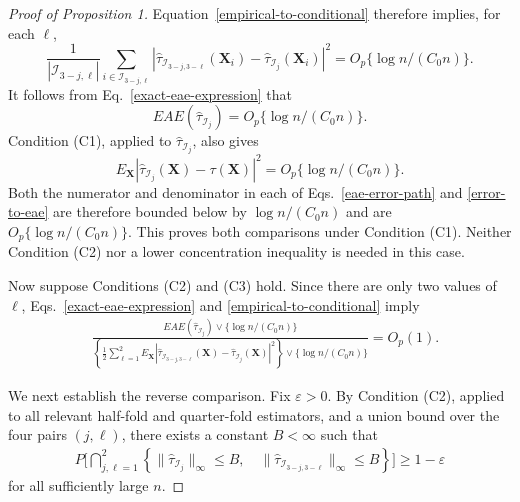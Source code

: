 \documentclass[11pt]{article}
\theoremstyle{referenceplain}
\theoremstyle{referencedefinition}
\theoremstyle{referenceremark}
\begin{document}
\begin{proof}[Proof of Proposition 1]
Equation~\eqref{empirical-to-conditional} therefore implies, for each
$\ell$,
\[
\frac{1}{|\mathcal I_{3-j,\ell}|}
\sum_{i\in\mathcal I_{3-j,\ell}}
\left|
\widehat\tau_{\mathcal I_{3-j,3-\ell}}(\mathbf X_i)
-\widehat\tau_{\mathcal I_j}(\mathbf X_i)
\right|^2
=
O_p\{\log n/({C_0}n)\}.
\]
It follows from Eq.~\eqref{exact-eae-expression} that
\[
EAE(\widehat\tau_{\mathcal I_j})
=
O_p\{\log n/({C_0}n)\}.
\]
Condition (C1), applied to $\widehat\tau_{\mathcal I_j}$, also gives
\[
E_{\mathbf X}
|\widehat\tau_{\mathcal I_j}(\mathbf X)-\tau(\mathbf X)|^2
=
O_p\{\log n/({C_0}n)\}.
\]
Both the numerator and denominator in each of
Eqs.~\eqref{eae-error-path} and \eqref{error-to-eae} are therefore
bounded below by $\log n/({C_0}n)$ and are
$O_p\{\log n/({C_0}n)\}$. This proves both comparisons under Condition
(C1). Neither Condition (C2) nor a lower concentration inequality is
needed in this case.

Now suppose Conditions (C2) and (C3) hold. Since there are only two
values of $\ell$, Eqs.~\eqref{exact-eae-expression} and
\eqref{empirical-to-conditional} imply
\begin{align}
&
\frac{
EAE(\widehat\tau_{\mathcal I_j})\vee\{\log n/({C_0}n)\}
}{
\left\{
\displaystyle
\frac12\sum_{\ell=1}^2
E_{\mathbf X}\left|
\widehat\tau_{\mathcal I_{3-j,3-\ell}}(\mathbf X)
-\widehat\tau_{\mathcal I_j}(\mathbf X)
\right|^2
\right\}
\vee\{\log n/({C_0}n)\}
}
=O_p(1).
\label{markov-direction}
\end{align}

We next establish the reverse comparison. Fix $\varepsilon>0$. By
Condition (C2), applied to all relevant half-fold and quarter-fold
estimators, and a union bound over the four pairs $(j,\ell)$, there
exists a constant $B<\infty$ such that
\begin{align}
P\Bigg[
\bigcap_{j,\ell=1}^2
\left\{
\|\widehat\tau_{\mathcal I_j}\|_\infty\le B,\quad
\|\widehat\tau_{\mathcal I_{3-j,3-\ell}}\|_\infty\le B
\right\}
\Bigg]
\ge1-\varepsilon
\label{common-boundedness}
\end{align}
for all sufficiently large $n$.


\end{proof}
\end{document}
